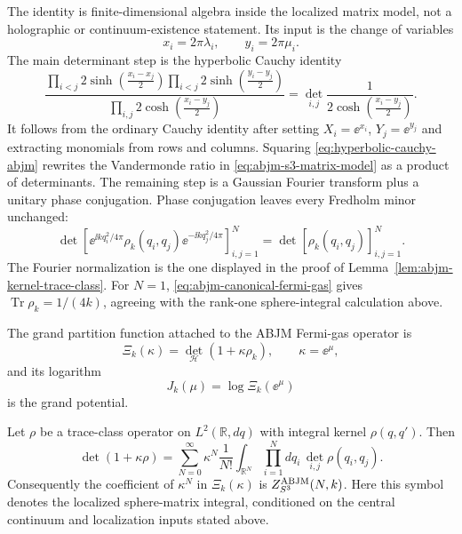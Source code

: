\begin{remark}
\label{rem:abjm-fermi-gas-identity-ingredients}
The identity is finite-dimensional algebra inside the localized matrix
model, not a holographic or continuum-existence statement.  Its input is the
change of variables
\[
  x_i=2\pi\lambda_i,\qquad y_i=2\pi\mu_i .
\]
The main determinant step is the hyperbolic Cauchy identity
\begin{equation}
  \frac{\prod_{i<j}2\sinh\!\left(\frac{x_i-x_j}{2}\right)
        \prod_{i<j}2\sinh\!\left(\frac{y_i-y_j}{2}\right)}
       {\prod_{i,j}2\cosh\!\left(\frac{x_i-y_j}{2}\right)}
  =
  \det_{i,j}\frac1{2\cosh\!\left(\frac{x_i-y_j}{2}\right)} .
  \label{eq:hyperbolic-cauchy-abjm}
\end{equation}
It follows from the ordinary Cauchy identity after setting
\(X_i=\ee^{x_i}\), \(Y_j=\ee^{y_j}\) and extracting monomials from rows and
columns.  Squaring \eqref{eq:hyperbolic-cauchy-abjm} rewrites the
Vandermonde ratio in \eqref{eq:abjm-s3-matrix-model} as a product of
determinants.  The remaining step is a Gaussian Fourier transform plus a
unitary phase conjugation.  Phase conjugation leaves every Fredholm minor
unchanged:
\[
  \det\!\left[
    \ee^{\ii k q_i^2/4\pi}\rho_k(q_i,q_j)
    \ee^{-\ii k q_j^2/4\pi}
  \right]_{i,j=1}^N
  =
  \det\!\left[\rho_k(q_i,q_j)\right]_{i,j=1}^N .
\]
The Fourier normalization is the one displayed in the proof of
Lemma~\ref{lem:abjm-kernel-trace-class}.  For \(N=1\),
\eqref{eq:abjm-canonical-fermi-gas} gives
\(\operatorname{Tr}\rho_k=1/(4k)\), agreeing with
the rank-one sphere-integral calculation above.
\end{remark}

\begin{definition}
\label{def:abjm-grand-partition-function}
The grand partition function attached to the ABJM Fermi-gas operator is
\begin{equation}
  \Xi_k(\kappa)
  =
  \det_{\mathcal H}(1+\kappa\rho_k),
  \qquad
  \kappa=\ee^\mu ,
  \label{eq:abjm-grand-partition-function}
\end{equation}
and its logarithm
\begin{equation}
  J_k(\mu)=\log\Xi_k(\ee^\mu)
  \label{eq:abjm-grand-potential}
\end{equation}
is the grand potential.
\end{definition}

\begin{lemma}
\label{lem:fredholm-canonical-coefficients}
Let \(\rho\) be a trace-class operator on \(L^2(\mathbb R,dq)\) with
integral kernel \(\rho(q,q')\).  Then
\begin{equation}
  \det(1+\kappa\rho)
  =
  \sum_{N=0}^{\infty}\kappa^N
  \frac1{N!}\int_{\mathbb R^N}\prod_{i=1}^N dq_i\,
  \det_{i,j}\rho(q_i,q_j).
  \label{eq:fredholm-minor-expansion}
\end{equation}
Consequently the coefficient of \(\kappa^N\) in \(\Xi_k(\kappa)\) is
\(Z^{\rm ABJM}_{S^3}(N,k)\).  Here this symbol denotes the localized
sphere-matrix integral, conditioned on the central continuum and localization
inputs stated above.
\end{lemma}

